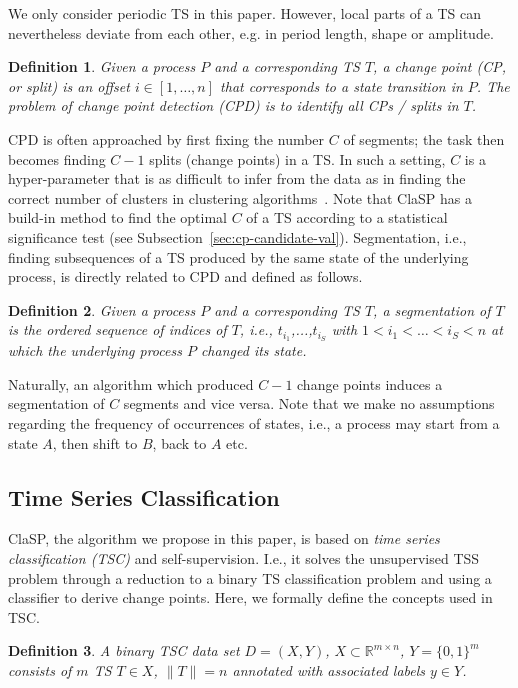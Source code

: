 \documentclass[pdflatex,sn-basic]{sn-jnl}
\newtheorem{definition}{Definition}
\begin{document}
We only consider periodic TS in this paper. However, local parts of a TS can nevertheless deviate from each other, e.g. in period length, shape or amplitude. 

\begin{definition}
Given a process $P$ and a corresponding TS $T$, a \emph{change point (CP, or split)} is an offset $i \in [1,\dots,n]$ that corresponds to a state transition in $P$. The problem of change point detection (CPD) is to identify all CPs / splits in $T$.
\end{definition}

CPD is often approached by first fixing the number $C$ of segments; the task then becomes finding $C-1$ splits (change points) in a TS. In such a setting, $C$ is a hyper-parameter that is as difficult to infer from the data as in finding the correct number of clusters in clustering algorithms~\citep{Nguyen2015}. Note that ClaSP has a build-in method to find the optimal $C$ of a TS according to a statistical significance test (see Subsection~\ref{sec:cp-candidate-val}). Segmentation, i.e., finding subsequences of a TS produced by the same state of the underlying process, is directly related to CPD and defined as follows.

\begin{definition}
Given a process $P$ and a corresponding TS $T$, a \emph{segmentation} of $T$ is the ordered sequence of indices of $T$, i.e., $t_{i_{1}}$,...,$t_{i_{S}}$ with ${1<i_1<\dots<i_S<n}$ at which the underlying process $P$ changed its state. 
\end{definition}

Naturally, an algorithm which produced $C-1$ change points induces a segmentation of $C$ segments and vice versa. Note that we make no assumptions regarding the frequency of occurrences of states, i.e., a process may start from a state $A$, then shift to $B$, back to $A$ etc. 


\subsection{Time Series Classification}

ClaSP, the algorithm we propose in this paper, is based on  \emph{time series classification (TSC)} and self-supervision. I.e., it solves the unsupervised TSS problem through a reduction to a binary TS classification problem and using a classifier to derive change points. Here, we formally define the concepts used in TSC. 

\begin{definition}
A binary TSC data set $D = (X, Y)$, $X \subset \mathbb{R}^{m \times n}$, $Y = \{0,1\}^m$ consists of $m$ TS $T \in X$, $\|T\| = n$ annotated with associated labels $y \in Y$. 
\end{definition}
\end{document}
